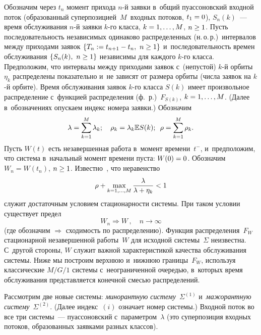 \begin{multicols}{2}
Обозначим через $t_n$ момент прихода $n$-й заявки в~общий пуассоновский входной  
поток (образованный суперпозицией~$M$~входных потоков, $t_1\hm=0$),   $S_n{(k)}$~--- 
время обслуживания  $n$-й заявки  $k$-го класса,  $k\hm=1,\ldots,M$, $n\hm\ge1$. Пусть 
последовательность независимых одинаково распределенных (н.\,о.\,р.)\ интервалов 
между приходами заявок  $\{T_n:=t_{n+1}\hm-t_n,\ n\hm\ge 1\}$ и~последовательность 
времен обслуживания  $\{S_n{(k)},\ n\hm\ge1\}$ независимы для каждого  $k$-го 
класса.
Предположим, что интервалы между приходами заявок с~(непустой)  $k$-й орбиты~$\eta_k$ 
распределены показательно и~не зависят от размера орбиты  (числа заявок 
на $k$-й орбите). Время обслуживания заявок $k$-го класса  $S(k)$ имеет 
произвольное распределение  с~функцией распределения (ф.~р.)\ $F_{S(k)}$, 
$k\hm=1,\ldots, M$. (Далее в~обозначениях  опускаем индекс номера заявки.)  Обозначим
\begin{equation*}
\lambda=\sum\limits_{k=1}^M\lambda_k ;\ \ \ \rho_k=\lambda_k\mathbb{E} S{(k)}; \enskip 
\rho=\sum\limits_{k=1}^M \rho_k.
\end{equation*}
Пусть $W(t)$ есть незавершенная работа в~момент времени~$t^-$, и~предположим, 
что система в~начальный момент времени пуста: $W(0)\hm=0$. Обозначим 
$W_n=W(t_n)$, $n\hm\ge1$.
Известно~\cite{Morozov2019}, что неравенство
 \begin{equation}
 \label{stability}
 \rho + \max\limits_{k=1,\ldots, M} \displaystyle\frac{\displaystyle \lambda\mathstrut}{\displaystyle \lambda+\eta_k\mathstrut} < 1
 \end{equation}
служит достаточным условием стационарности сис\-те\-мы.  При  таком условии 
существует  предел
$$
W_n \Rightarrow W\,,\quad n\to\infty
$$
(где обозначим $\Rightarrow$ схо\-ди\-мость по распределению). Функция распределения~$F_W$ 
стационарной незавершенной работы~$W$ для исходной сис\-те\-мы~$\Sigma$ неизвестна. 
С~другой стороны, $W$ служит важной характеристикой качества обслуживания 
сис\-те\-мы. Ниже мы построим верхнюю и~нижнюю границы~$F_W$, используя 
классические  $M/G/1$ сис\-те\-мы с~неограниченной оче\-редью, в~которых время 
обслуживания пред\-став\-ля\-ет\-ся конечной смесью распределений.


Рассмотрим две новые системы: \textit{минорантную сис\-те\-му}~$\Sigma^{(1)}$ 
и~\textit{мажорантную сис\-те\-му}~$\Sigma^{(2)}$. (Далее индекс~$(i)$ означает номер 
сис\-те\-мы.)
Входной поток во все три сис\-те\-мы~--- пуассоновский  с~параметром~$\lambda$ (это 
суперпозиция входных потоков, образованных заявками разных классов).


\end{multicols}
